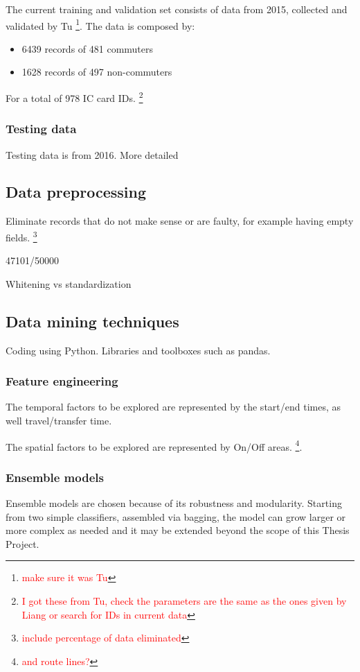 \documentclass{article}
\newcommand{\selfnote}[1]{\footnote{\textcolor{red}{#1}}}
\begin{document}
The current training and validation set consists of data from 2015, collected and validated by Tu \cite{tu2016impact} \selfnote{make sure it was Tu}. The data is composed by:

\begin{itemize}
\item 6439 records of 481 commuters
\item 1628 records of 497 non-commuters
\end{itemize}

For a total of 978 IC card IDs. \selfnote{I got these from Tu, check the parameters are the same as the ones given by Liang or search for IDs in current data}

\subsubsection{Testing data}
Testing data is from 2016. More detailed

\subsection{Data preprocessing}
Eliminate records that do not make sense or are faulty, for example having empty fields. \selfnote{include percentage of data eliminated}

47101/50000

Whitening vs standardization

\subsection{Data mining techniques}
Coding using Python. Libraries and toolboxes such as pandas.

\subsubsection{Feature engineering}
The temporal factors to be explored are represented by the start/end times, as well travel/transfer time.

The spatial factors to be explored are represented by On/Off areas. \selfnote{and route lines?}. 

\subsubsection{Ensemble models}
Ensemble models are chosen because of its robustness and modularity. Starting from two simple classifiers, assembled via bagging, the model can grow larger or more complex as needed and it may be extended beyond the scope of this Thesis Project. 
\end{document}
